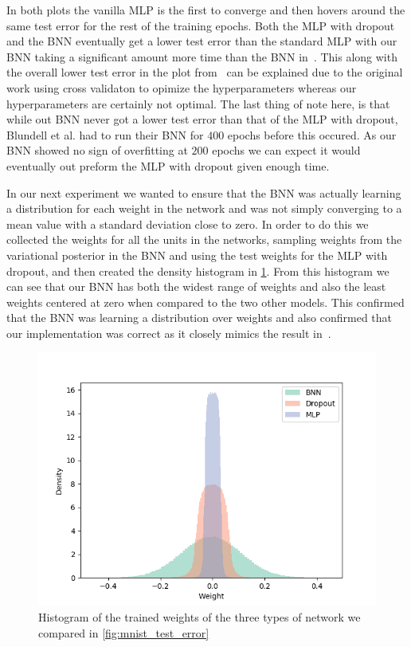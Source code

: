 \documentclass[11pt]{article}
\begin{document}
In both plots the vanilla MLP is the first to converge and then hovers around
the same test error for the rest of the training epochs. Both the MLP with
dropout and the BNN eventually get a lower test error than the standard MLP
with our BNN taking a significant amount more time than the BNN
in~\cite{blundell}. This along with the overall lower test error in the plot
from~\cite{blundell} can be explained due to the original work using cross
validaton to opimize the hyperparameters whereas our hyperparameters are
certainly not optimal. The last thing of note here, is that while out BNN never
got a lower test error than that of the MLP with dropout, Blundell et al. had
to run their BNN for $400$ epochs before this occured. As our BNN showed no
sign of overfitting at $200$ epochs we can expect it would eventually out
preform the MLP with dropout given enough time.

In our next experiment we wanted to ensure that the BNN was actually learning 
a distribution for each weight in the network and was not simply converging to
a mean value with a standard deviation close to zero. In order to do this we
collected the weights for all the units in the networks, sampling weights 
from the variational posterior in the BNN and using the test weights for the 
MLP with dropout, and then created the density histogram in
\cref{fig:mnist_weight_density}. From this histogram we can see that our BNN
has both the widest range of weights and also the least weights centered at
zero when compared to the two other models. This confirmed that the BNN was
learning a distribution over weights and also confirmed that our 
implementation was correct as it closely mimics the result in~\cite{blundell}.

\begin{figure}
  \centering\includegraphics[width=.6\textwidth]{figures/weight_density_compare.png}
  \caption{Histogram of the trained weights of the three types of network we
  compared in \cref{fig:mnist_test_error}}
  \label{fig:mnist_weight_density}
\end{figure}
\end{document}
